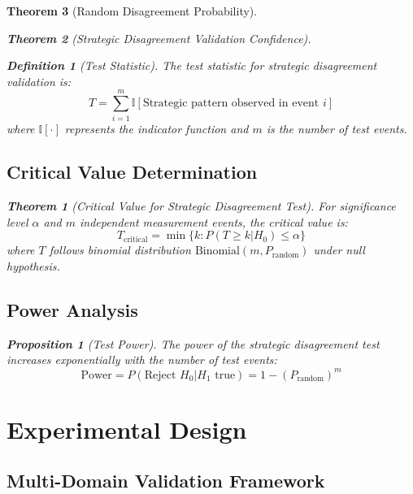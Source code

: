 \documentclass[12pt,a4paper]{article}
\newtheorem{theorem}{Theorem}
\newtheorem{definition}{Definition}
\newtheorem{proposition}{Proposition}
\begin{document}
\begin{theorem}[Random Disagreement Probability]
\begin{theorem}[Strategic Disagreement Validation Confidence]
\begin{definition}[Test Statistic]
The test statistic for strategic disagreement validation is:
\begin{equation}
T = \sum_{i=1}^{m} \mathbb{I}[\text{Strategic pattern observed in event } i]
\end{equation}
where $\mathbb{I}[\cdot]$ represents the indicator function and $m$ is the number of test events.
\end{definition}

\subsection{Critical Value Determination}

\begin{theorem}[Critical Value for Strategic Disagreement Test]
For significance level $\alpha$ and $m$ independent measurement events, the critical value is:
\begin{equation}
T_{\text{critical}} = \min\{k : P(T \geq k | H_0) \leq \alpha\}
\end{equation}
where $T$ follows binomial distribution $\text{Binomial}(m, P_{\text{random}})$ under null hypothesis.
\end{theorem}

\subsection{Power Analysis}

\begin{proposition}[Test Power]
The power of the strategic disagreement test increases exponentially with the number of test events:
\begin{equation}
\text{Power} = P(\text{Reject } H_0 | H_1 \text{ true}) = 1 - (P_{\text{random}})^m
\end{equation}
\end{proposition}

\section{Experimental Design}

\subsection{Multi-Domain Validation Framework}


\end{theorem}
\end{theorem}
\end{document}
